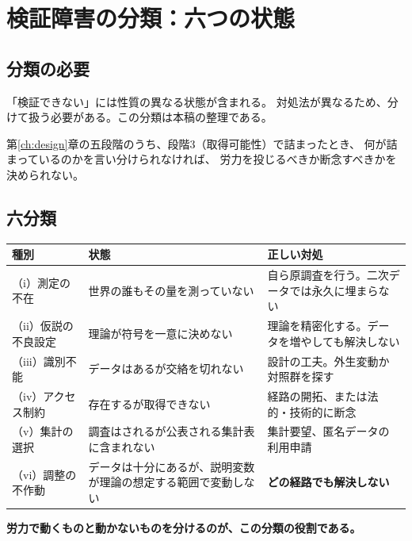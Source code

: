 \chapter{検証障害の分類：六つの状態}
\label{part:obstacles}

\section{分類の必要}

「検証できない」には性質の異なる状態が含まれる。
対処法が異なるため、分けて扱う必要がある。この分類は本稿の整理である。

第\ref{ch:design}章の五段階のうち、段階3（取得可能性）で詰まったとき、
何が詰まっているのかを言い分けられなければ、
労力を投じるべきか断念すべきかを決められない。

\section{六分類}
\label{sec:obstacle-taxonomy}

\begin{center}
\begin{tabularx}{\textwidth}{@{}l>{\raggedright\arraybackslash}p{}X@{}}
\toprule
種別 & 状態 & 正しい対処 \\
\midrule
（i）測定の不在 & 世界の誰もその量を測っていない & 自ら原調査を行う。二次データでは永久に埋まらない \\
（ii）仮説の不良設定 & 理論が符号を一意に決めない & 理論を精密化する。データを増やしても解決しない \\
（iii）識別不能 & データはあるが交絡を切れない & 設計の工夫。外生変動か対照群を探す \\
（iv）アクセス制約 & 存在するが取得できない & 経路の開拓、または法的・技術的に断念 \\
（v）集計の選択 & 調査はされるが公表される集計表に含まれない & 集計要望、匿名データの利用申請 \\
（vi）調整の不作動 & データは十分にあるが、説明変数が理論の想定する範囲で変動しない & \textbf{どの経路でも解決しない} \\
\bottomrule
\end{tabularx}
\label{tab:obstacle-taxonomy}
\label{sec:sixth-obstacle}
\end{center}

\textbf{労力で動くものと動かないものを分けるのが、この分類の役割である。}

